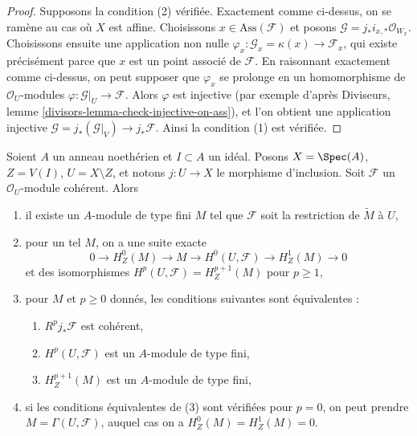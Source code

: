 \begin{proof}
\medskip\noindent
Supposons la condition (2) vérifiée. Exactement comme ci-dessus, on se ramène au cas où $X$ est affine. Choisissons $x \in \text{Ass}(\mathcal{F})$ et posons $\mathcal{G} = j_*i_{x, *}\mathcal{O}_{W_x}$. Choisissons ensuite une application non nulle $\varphi_x : \mathcal{G}_x = \kappa(x) \to \mathcal{F}_x$, qui existe précisément parce que $x$ est un point associé de $\mathcal{F}$. En raisonnant exactement comme ci-dessus, on peut supposer que $\varphi_x$ se prolonge en un homomorphisme de $\mathcal{O}_U$-modules $\varphi : \mathcal{G}|_U \to \mathcal{F}$. Alors $\varphi$ est injective (par exemple d'après Diviseurs, lemme \ref{divisors-lemma-check-injective-on-ass}), et l'on obtient une application injective $\mathcal{G} = j_*(\mathcal{G}|_V) \to j_*\mathcal{F}$. Ainsi la condition (1) est vérifiée.
\end{proof}

\begin{lemma}
\label{lemma-finiteness-pushforwards-and-H1-local}
Soient $A$ un anneau noethérien et $I \subset A$ un idéal. Posons $X = \Spec(A)$, $Z = V(I)$, $U = X \setminus Z$, et notons $j : U \to X$ le morphisme d'inclusion. Soit $\mathcal{F}$ un $\mathcal{O}_U$-module cohérent. Alors
\begin{enumerate}
\item il existe un $A$-module de type fini $M$ tel que $\mathcal{F}$ soit la restriction de $\widetilde{M}$ à $U$,
\item pour un tel $M$, on a une suite exacte
$$
0 \to H^0_Z(M) \to M \to H^0(U, \mathcal{F}) \to H^1_Z(M) \to 0
$$
et des isomorphismes $H^p(U, \mathcal{F}) = H^{p + 1}_Z(M)$ pour $p \geq 1$,
\item pour $M$ et $p \geq 0$ donnés, les conditions suivantes sont équivalentes :
\begin{enumerate}
\item $R^pj_*\mathcal{F}$ est cohérent,
\item $H^p(U, \mathcal{F})$ est un $A$-module de type fini,
\item $H^{p + 1}_Z(M)$ est un $A$-module de type fini,
\end{enumerate}
\item si les conditions équivalentes de (3) sont vérifiées pour $p = 0$, on peut prendre $M = \Gamma(U, \mathcal{F})$, auquel cas on a $H^0_Z(M) = H^1_Z(M) = 0$.
\end{enumerate}
\end{lemma}

